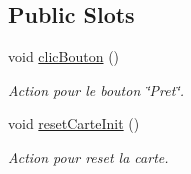 \subsection*{Public Slots}
\begin{DoxyCompactItemize}
\item 
void \hyperlink{classAffichageInitJ2_ae8ff375ea33c514c71b5500d7d985e00}{clic\+Bouton} ()
\begin{DoxyCompactList}\small\item\em Action pour le bouton \char`\"{}\+Pret\char`\"{}. \end{DoxyCompactList}\item 
void \hyperlink{classAffichageInitJ2_abc45e1837c1612033c6c577a4825769a}{reset\+Carte\+Init} ()
\begin{DoxyCompactList}\small\item\em Action pour reset la carte. \end{DoxyCompactList}\end{DoxyCompactItemize}
